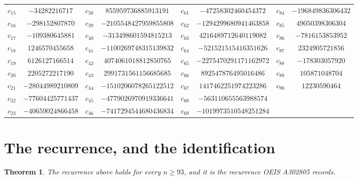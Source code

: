 \documentclass[11pt,a4paper]{article}
\theoremstyle{plain}
\newtheorem{theorem}{Theorem}
\theoremstyle{definition}
\begin{document}
\begin{center}
\begin{tabular}{cccccccc}
$c_{15}$ & $-34282216717$ & $c_{38}$ & $855959736885913191$ & $c_{61}$ & $-47258302460454372$ & $c_{84}$ & $-196849836306432$ \\
$c_{16}$ & $-298152807870$ & $c_{39}$ & $-2105548427959855808$ & $c_{62}$ & $-1294299680941463858$ & $c_{85}$ & $49050398306304$ \\
$c_{17}$ & $-109380645881$ & $c_{40}$ & $-313498601594815213$ & $c_{63}$ & $4216489712640119082$ & $c_{86}$ & $-7816153853952$ \\
$c_{18}$ & $1246570455658$ & $c_{41}$ & $-1100269748315139832$ & $c_{64}$ & $-521521515416351626$ & $c_{87}$ & $2324905721856$ \\
$c_{19}$ & $6126127166514$ & $c_{42}$ & $4074061018812850765$ & $c_{65}$ & $-2275470291171162972$ & $c_{88}$ & $-178303057920$ \\
$c_{20}$ & $2205272217190$ & $c_{43}$ & $2991731561156685685$ & $c_{66}$ & $892547876495016486$ & $c_{89}$ & $105871048704$ \\
$c_{21}$ & $-28044989210809$ & $c_{44}$ & $-1510206078265122512$ & $c_{67}$ & $1417462251974223286$ & $c_{90}$ & $12230590464$ \\
$c_{22}$ & $-77604425771437$ & $c_{45}$ & $-4779026970919336641$ & $c_{68}$ & $-563110655563988574$ &  &  \\
$c_{23}$ & $-40659024866458$ & $c_{46}$ & $-7417294544680436834$ & $c_{69}$ & $-1019973510548251284$ &  &  \\
\end{tabular}
\end{center}

\section{The recurrence, and the identification}

\begin{theorem}
The recurrence above holds for every $n\ge93$, and it is the recurrence OEIS A302805 records.
\end{theorem}
\end{document}
